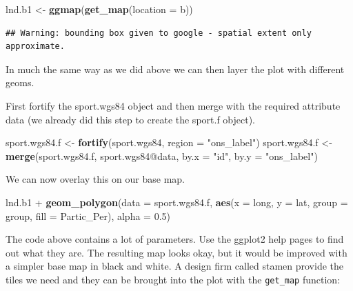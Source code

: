 \documentclass[]{article}
\newenvironment{Shaded}{}{}
\newcommand{\KeywordTok}[1]{\textcolor[rgb]{0.00,0.44,0.13}{\textbf{{#1}}}}
\newcommand{\DataTypeTok}[1]{\textcolor[rgb]{0.56,0.13,0.00}{{#1}}}
\newcommand{\FloatTok}[1]{\textcolor[rgb]{0.25,0.63,0.44}{{#1}}}
\newcommand{\StringTok}[1]{\textcolor[rgb]{0.25,0.44,0.63}{{#1}}}
\newcommand{\NormalTok}[1]{{#1}}
\begin{document}
\begin{Shaded}
\begin{Highlighting}[]
\NormalTok{lnd.b1 <-}\StringTok{ }\KeywordTok{ggmap}\NormalTok{(}\KeywordTok{get_map}\NormalTok{(}\DataTypeTok{location =} \NormalTok{b))}
\end{Highlighting}
\end{Shaded}

\begin{verbatim}
## Warning: bounding box given to google - spatial extent only approximate.
\end{verbatim}

In much the same way as we did above we can then layer the plot with
different geoms.

First fortify the sport.wgs84 object and then merge with the required
attribute data (we already did this step to create the sport.f object).

\begin{Shaded}
\begin{Highlighting}[]
\NormalTok{sport.wgs84.f <-}\StringTok{ }\KeywordTok{fortify}\NormalTok{(sport.wgs84, }\DataTypeTok{region =} \StringTok{"ons_label"}\NormalTok{)}
\NormalTok{sport.wgs84.f <-}\StringTok{ }\KeywordTok{merge}\NormalTok{(sport.wgs84.f, sport.wgs84@data, }\DataTypeTok{by.x =} \StringTok{"id"}\NormalTok{, }\DataTypeTok{by.y =} \StringTok{"ons_label"}\NormalTok{)}
\end{Highlighting}
\end{Shaded}

We can now overlay this on our base map.

\begin{Shaded}
\begin{Highlighting}[]
\NormalTok{lnd.b1 +}\StringTok{ }\KeywordTok{geom_polygon}\NormalTok{(}\DataTypeTok{data =} \NormalTok{sport.wgs84.f, }\KeywordTok{aes}\NormalTok{(}\DataTypeTok{x =} \NormalTok{long, }\DataTypeTok{y =} \NormalTok{lat, }\DataTypeTok{group =} \NormalTok{group, }
    \DataTypeTok{fill =} \NormalTok{Partic_Per), }\DataTypeTok{alpha =} \FloatTok{0.5}\NormalTok{)}
\end{Highlighting}
\end{Shaded}

The code above contains a lot of parameters. Use the ggplot2 help pages
to find out what they are. The resulting map looks okay, but it would be
improved with a simpler base map in black and white. A design firm
called stamen provide the tiles we need and they can be brought into the
plot with the \texttt{get\_map} function:
\end{document}
